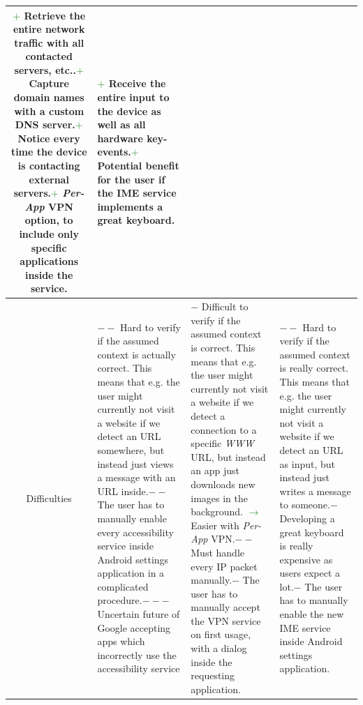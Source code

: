 \begin{table}
\begin{tabularx}{\textwidth + 5pt}{| @{\hspace{3pt}} c || @{\hspace{3pt}} M | @{\hspace{3pt}} M | @{\hspace{3pt}} M|}
		\textcolor{ForestGreen}{\fontsize{12pt}{13pt}\boldmath$+$} Retrieve the entire network traffic with all contacted servers, etc..\newline\textcolor{ForestGreen}{\fontsize{12pt}{13pt}\boldmath$+$} Capture domain names with a custom DNS server.\newline\textcolor{ForestGreen}{\fontsize{12pt}{13pt}\boldmath$+$} Notice every time the device is contacting external servers.\newline\textcolor{ForestGreen}{\fontsize{12pt}{13pt}\boldmath$+$} \emph{Per-App} VPN option, to include only specific applications inside the service. &
		\textcolor{ForestGreen}{\fontsize{12pt}{13pt}\boldmath$+$} Receive the entire input to the device as well as all hardware key-events.\newline\textcolor{ForestGreen}{\fontsize{12pt}{13pt}\boldmath$+$} Potential benefit for the user if the IME service implements a great keyboard. 
		\\
		\hline
		Difficulties & 
		\textcolor{BrickRed}{\fontsize{12pt}{13pt}\boldmath$--$} Hard to verify if the assumed context is actually correct. This means that e.g. the user might currently not visit a website if we detect an URL somewhere, but instead just views a message with an URL inside.\newline\textcolor{BrickRed}{\fontsize{12pt}{13pt}\boldmath$--$} The user has to manually enable every accessibility service inside Android settings application in a complicated procedure.\newline\textcolor{BrickRed}{\fontsize{12pt}{13pt}\boldmath$---$} Uncertain future of Google accepting apps which incorrectly use the accessibility service &
		\textcolor{BrickRed}{\fontsize{12pt}{13pt}\boldmath$-$} Difficult to verify if the assumed context is correct. This means that e.g. the user might currently not visit a website if we detect a connection to a specific \emph{WWW} URL, but instead an \gls{app} just downloads new images in the background. \textcolor{ForestGreen}{$\rightarrow$} Easier with \emph{Per-App} VPN.\newline\textcolor{BrickRed}{\fontsize{12pt}{13pt}\boldmath$--$} Must handle every IP packet manually.\newline\textcolor{BrickRed}{\fontsize{12pt}{13pt}\boldmath$-$} The user has to manually accept the VPN service on first usage, with a dialog inside the requesting application. &
		\textcolor{BrickRed}{\fontsize{12pt}{13pt}\boldmath$--$} Hard to verify if the assumed context is really correct. This means that e.g. the user might currently not visit a website if we detect an URL as input, but instead just writes a message to someone.\newline\textcolor{BrickRed}{\fontsize{12pt}{13pt}\boldmath$-$} Developing a great keyboard is really expensive as users expect a lot.\newline\textcolor{BrickRed}{\fontsize{12pt}{13pt}\boldmath$-$} The user has to manually enable the new IME service inside Android settings application.

\end{tabularx}
\end{table}
